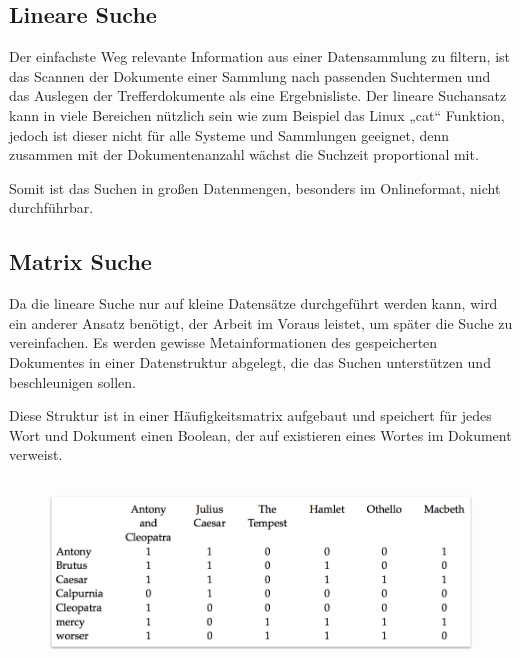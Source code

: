 \subsection[Lineare Suche]{Lineare Suche}



Der einfachste Weg relevante Information aus einer Datensammlung zu
filtern, ist das Scannen der Dokumente einer Sammlung nach passenden
Suchtermen und das Auslegen der Trefferdokumente als eine
Ergebnisliste. Der lineare Suchansatz kann in viele Bereichen nützlich
sein wie zum Beispiel das Linux „cat“ Funktion, jedoch ist dieser nicht
für alle Systeme und Sammlungen geeignet, denn zusammen mit der
Dokumentenanzahl wächst die Suchzeit proportional mit. 

Somit ist das Suchen in großen Datenmengen, %
besonders im Onlineformat, nicht durchführbar.







\subsection[Matrix Suche]{Matrix Suche}



Da die lineare Suche nur auf kleine Datensätze durchgeführt werden kann,
wird ein anderer Ansatz benötigt, der Arbeit im Voraus leistet, um
später die Suche zu vereinfachen. Es werden gewisse Metainformationen
des gespeicherten Dokumentes in einer Datenstruktur abgelegt, die das
Suchen unterstützen und beschleunigen sollen. 

Diese Struktur ist in einer Häufigkeitsmatrix aufgebaut und speichert
für jedes Wort und Dokument einen Boolean, der auf existieren eines
Wortes im Dokument verweist.

\begin{figure}
\centering
\includegraphics[width=13.54cm,height=4.955cm]{bilder/SeminararbeitArkadij-img1.png}
\end{figure}



